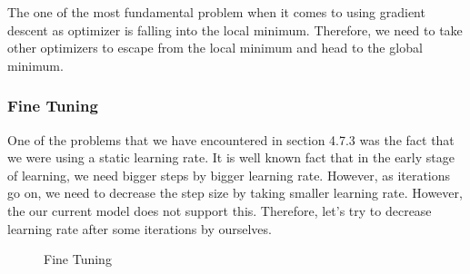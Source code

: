 \documentclass{homework}
\begin{document}
The one of the most fundamental problem when it comes to using gradient descent as optimizer is falling into the local minimum. Therefore, we need to take other optimizers to escape from the local minimum and head to the global minimum. 

\subsubsection{Fine Tuning}
\label{sec:finetuning}
One of the problems that we have encountered in section 4.7.3 was the fact that we were using a static learning rate. It is well known fact that in the early stage of learning, we need bigger steps by bigger learning rate. However, as iterations go on, we need to decrease the step size by taking smaller learning rate. However, the our current model does not support this. Therefore, let's try to decrease learning rate after some iterations by ourselves. 

\begin{figure}[h]
    \centering
    \caption{Fine Tuning}
\end{figure}
\end{document}
